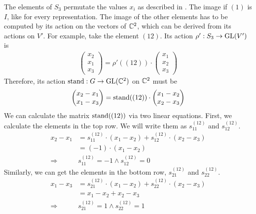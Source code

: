The elements of $S_3$ permutate the values $x_i$ as described in .
The image if $(1)$ is $I$, like for every representation.
The image of the other elements has to be computed by its action on the vectors of $\mathbb{C}^2$, which can be derived from its actions on $V'$.
For example, take the element $(12)$.
Its action $\rho': S_3 \to \operatorname{GL}(V')$ is
\begin{align}
    \begin{pmatrix}
        x_2 \\ x_1 \\ x_3
    \end{pmatrix} = \rho'((12)) \cdot \begin{pmatrix}
        x_1 \\ x_2 \\ x_3
    \end{pmatrix}
\end{align}
Therefore, its action $\operatorname{stand}: G \to \operatorname{GL}(\mathbb{C}^2)$ on $\mathbb{C}^2$ must be
\begin{align}
    \begin{pmatrix}
        x_2 - x_1 \\
        x_1 - x_3
    \end{pmatrix} = \operatorname{stand}((12)) \cdot \begin{pmatrix}
        x_1 - x_2 \\
        x_2 - x_3
    \end{pmatrix}
\end{align}
We can calculate the matrix $\operatorname{stand}((12))$ via two linear equations.
First, we calculate the elements in the top row.
We will write them as $s^{(12)}_{11}$ and $s^{(12)}_{12}$.
\begin{subequations}
\begin{align}
    x_2 - x_1 & = s^{(12)}_{11} \cdot (x_1 - x_2) + s^{(12)}_{12} \cdot (x_2 - x_3) \\
    & = (-1) \cdot (x_1 - x_2) \\
    \Longrightarrow \quad & s^{(12)}_{11} = -1 \land s^{(12)}_{12} = 0
\end{align}
\end{subequations}
Similarly, we can get the elements in the bottom row, $s^{(12)}_{21}$ and $s^{(12)}_{22}$.
\begin{subequations}
\begin{align}
    x_1 - x_3 & = s^{(12)}_{21} \cdot (x_1 - x_2) + s^{(12)}_{22} \cdot (x_2 - x_3) \\
    & = x_1 - x_2 + x_2 - x_3 \\
    \Longrightarrow \quad & s^{(12)}_{21} = 1 \land s^{(12)}_{22} = 1
\end{align}
\end{subequations}

